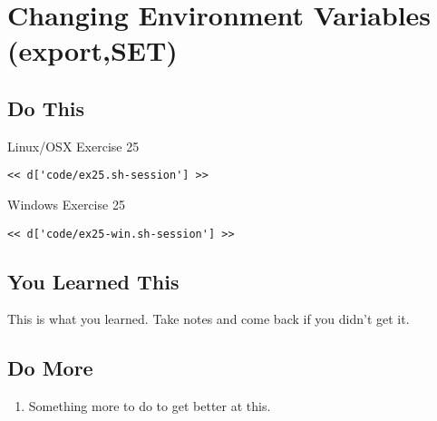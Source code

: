 \chapter{Changing Environment Variables (export,SET)}

\section{Do This}

\begin{code}{Linux/OSX Exercise 25}
\begin{Verbatim}
<< d['code/ex25.sh-session'] >>
\end{Verbatim}
\end{code}

\begin{code}{Windows Exercise 25}
\begin{Verbatim}
<< d['code/ex25-win.sh-session'] >>
\end{Verbatim}
\end{code}

\section{You Learned This}

This is what you learned.  Take notes and come back if you didn't get it.

\section{Do More}

\begin{enumerate}
\item Something more to do to get better at this.
\end{enumerate}

